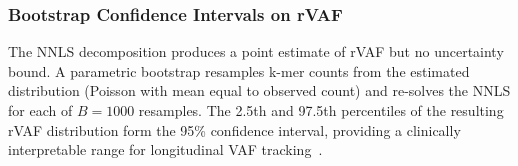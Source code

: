 \subsubsection{Bootstrap Confidence Intervals on rVAF}

The NNLS decomposition produces a point estimate of rVAF but no uncertainty
bound.  A parametric bootstrap resamples k-mer counts from the estimated
distribution (Poisson with mean equal to observed count) and re-solves the
NNLS for each of $B = 1000$ resamples.  The 2.5th and 97.5th percentiles of the
resulting rVAF distribution form the 95\% confidence interval, providing a
clinically interpretable range for longitudinal VAF tracking~\cite{jennings2017assessing}.
